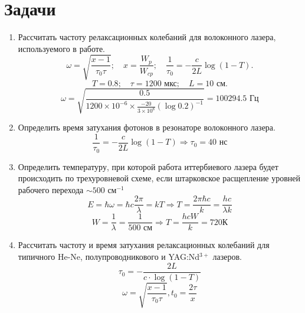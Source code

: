 \documentclass[a4paper, 12pt]{article}
\begin{document}
	\section{Задачи}
	\begin{enumerate}
			\item Рассчитать частоту релаксационных колебаний для волоконного лазера, используемого в работе.
			\begin{equation*}
				\omega=\sqrt{\frac{x-1}{\tau_0\tau}};\quad x=\frac{W_p}{W_{cp}};\quad \frac{1}{\tau_0}=-\frac{c}{2L}\log\left(1-T\right).
			\end{equation*}
			\begin{equation*}
				T=0.8;\quad \tau=1200 \text{ мкс};\quad L=10\text{ см}.
			\end{equation*}
			\begin{equation*}
				\omega=\sqrt{\frac{0.5}{1200\times10^{-6}\times\frac{-20}{3\times10^8}\left(\log0.2\right)^{-1}}}=100294.5\text{ Гц}
			\end{equation*}
			\item Определить время затухания фотонов в резонаторе волоконного лазера.
			\begin{equation*}
				\frac{1}{\tau_0}=-\frac{c}{2L}\log\left(1-T\right)\Rightarrow \tau_0=40\text{ нс}
			\end{equation*}
			\item Определить температуру, при которой работа иттербиевого лазера будет происходить по трехуровневой схеме, если штарковское расщепление уровней рабочего перехода $\sim 500\text{ см}^{-1}$
				\begin{equation*}
					E=\hbar\omega=\hbar c \frac{2\pi}{\lambda}=kT\Rightarrow T=\frac{2\pi\hbar c}{k}=\frac{hc}{\lambda k}
				\end{equation*}
				\begin{equation*}
					W=\frac{1}{\lambda}=\frac{1}{500\text{ см}}\Rightarrow T=\frac{hcW}{k}=720\text{К}
				\end{equation*}
			\item Рассчитать частоту и время затухания релаксационных колебаний для типичного He-Ne, полупроводникового и YAG:Nd$^{3+}$ лазеров.
			\begin{equation*}
				\tau_0=-\frac{2L}{c\cdot\log\left(1-T\right)}
			\end{equation*}
			\begin{equation*}
				\omega=\sqrt{\frac{x-1}{\tau_0\tau}}, t_0=\frac{2\tau}{x}
			\end{equation*}
			\begin{table}[!htb]

\end{table}
\end{enumerate}
\end{document}
